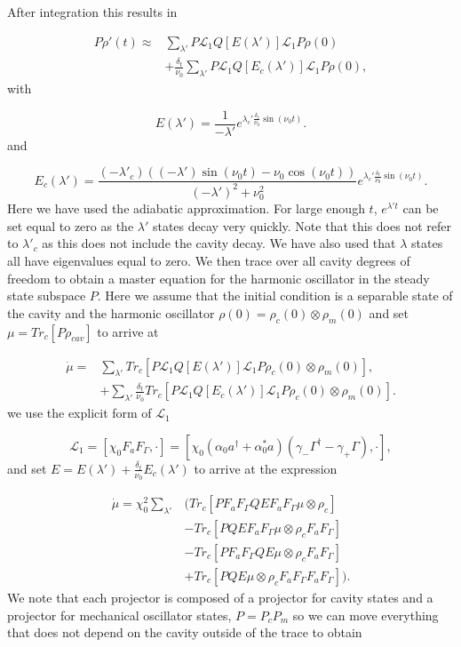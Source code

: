 \documentclass[reprint, amsmath,amssymb, aps,pra]{revtex4-1}
\begin{document}
 After integration this results in

\begin{align}
P\dot{\rho}'(t)\approx& \sum_{\lambda'}P \mathcal{L}_1Q[E(\lambda')]\mathcal{L}_1P\rho(0)\\
&+\frac{\delta_t}{\nu_0}\sum_{\lambda'}P\mathcal{L}_1Q[E_c(\lambda')]\mathcal{L}_1P\rho(0),\nonumber
\end{align}  with

\begin{equation}
E(\lambda') = \frac{1}{-\lambda'}e^{\lambda_c'\frac{\delta_t}{\nu_0}\sin(\nu_0t)}.
\end{equation} and

\begin{equation}
E_c(\lambda')=\frac{(-\lambda'_c)((-\lambda')\sin(\nu_0 t)-\nu_0\cos(\nu_0t))}{(-\lambda')^2 + \nu_0^2}e^{\lambda_c'\frac{\delta_t}{\nu_0}\sin(\nu_0t)}.
\end{equation} Here we have used the adiabatic approximation. For large enough $t$, $e^{\lambda't}$ can be set equal to zero as the $\lambda'$ states decay very quickly. Note that this does not refer to $\lambda'_c$ as this does not include the cavity decay. We have also used that $\lambda$ states all have eigenvalues equal to zero. We then trace over all cavity degrees of freedom to obtain a master equation for the harmonic oscillator in the steady state subspace $P$. Here we assume that the initial condition is a separable state of the cavity and the harmonic oscillator $\rho(0)=\rho_{c}(0)\otimes\rho_{m}(0)$  and  set $\mu = Tr_c[P\rho_{cav}]$ to arrive at 

\begin{align}
\dot{\mu}=&\sum_{\lambda'}Tr_c[P \mathcal{L}_1Q[E(\lambda')]\mathcal{L}_1P\rho_{c}(0)\otimes\rho_{m}(0) ],\\
&+\sum_{\lambda'}\frac{\delta_t}{\nu_0}Tr_c[P\mathcal{L}_1Q[E_c(\lambda')]\mathcal{L}_1P\rho_{c}(0)\otimes\rho_{m}(0) ]\nonumber.
\end{align} we use the explicit form of $\mathcal{L}_1$ 

\begin{equation}
\mathcal{L}_1 = [\chi_0 F_aF_\Gamma,\cdot] = [\chi_0(\alpha_0 a^\dagger + \alpha_0^* a)(\gamma_-\Gamma^\dagger-\gamma_+\Gamma),\cdot],
\end{equation}and set $E= E(\lambda') +\frac{\delta_t}{\nu_0} E_c(\lambda')$ to  arrive at the expression

\begin{align*}
\dot{\mu} = \chi_0^2 \sum_{\lambda'}&( Tr_c[PF_aF_\Gamma QEF_aF_\Gamma \mu \otimes \rho_{c}]\\
&- Tr_c[PQEF_aF_\Gamma\mu \otimes \rho_{c} F_aF_\Gamma ]\nonumber \\
&-Tr_c[PF_aF_\Gamma QE\mu \otimes \rho_{c} F_aF_\Gamma ] \nonumber\\ 
&+Tr_c[PQE\mu \otimes \rho_{c}F_aF_\Gamma  F_aF_\Gamma ]). \nonumber
\end{align*}  We note that each projector is composed of a projector for cavity states and a projector for mechanical oscillator states, $P=P_c P_m$ so we can move everything that does not depend on the cavity outside of the trace to obtain
\end{document}
